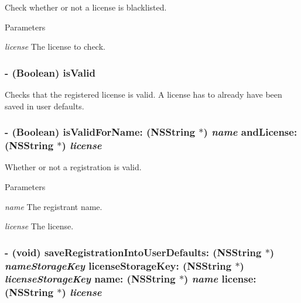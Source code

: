 Check whether or not a license is blacklisted. 
\begin{DoxyParams}{Parameters}
\item[{\em license}]The license to check. \end{DoxyParams}
\hypertarget{interface_g_d_registration_a172ffae07aff61343bf35bd93d50d9f2}{
\subsubsection[{isValid}]{\setlength{\rightskip}{0pt plus 5cm}-\/ (Boolean) isValid }}
\label{interface_g_d_registration_a172ffae07aff61343bf35bd93d50d9f2}


Checks that the registered license is valid. A license has to already have been saved in user defaults. \hypertarget{interface_g_d_registration_aff2e80860b72d462954323dd0203834f}{
\subsubsection[{isValidForName:andLicense:}]{\setlength{\rightskip}{0pt plus 5cm}-\/ (Boolean) isValidForName: (NSString $\ast$) {\em name}\/ andLicense: (NSString $\ast$) {\em license}}}
\label{interface_g_d_registration_aff2e80860b72d462954323dd0203834f}


Whether or not a registration is valid. 
\begin{DoxyParams}{Parameters}
\item[{\em name}]The registrant name. \item[{\em license}]The license. \end{DoxyParams}
\hypertarget{interface_g_d_registration_acc5044a15435a573919d7f6c68a70ff0}{
\subsubsection[{saveRegistrationIntoUserDefaults:licenseStorageKey:name:license:}]{\setlength{\rightskip}{0pt plus 5cm}-\/ (void) saveRegistrationIntoUserDefaults: (NSString $\ast$) {\em nameStorageKey}\/ licenseStorageKey: (NSString $\ast$) {\em licenseStorageKey}\/ name: (NSString $\ast$) {\em name}\/ license: (NSString $\ast$) {\em license}}}
\label{interface_g_d_registration_acc5044a15435a573919d7f6c68a70ff0}


